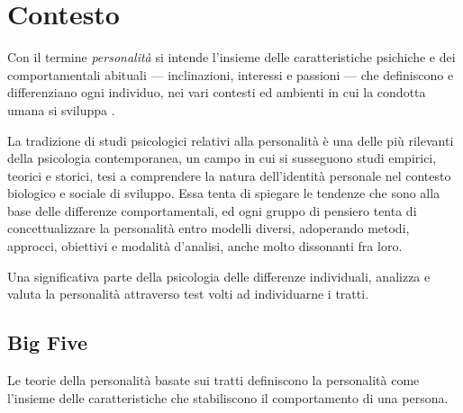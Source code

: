 \chapter{Contesto}
\label{chap:contesto}

Con il termine \emph{personalità} si intende l'insieme delle caratteristiche psichiche e dei comportamentali abituali --- inclinazioni, interessi e passioni --- che definiscono e differenziano ogni individuo, nei vari contesti ed ambienti in cui la condotta umana si sviluppa \cite{corr2009cambridge,sadock2000comprehensive}.

La tradizione di studi psicologici relativi alla personalità è una delle più rilevanti della psicologia contemporanea, un campo in cui si susseguono studi empirici, teorici e storici, tesi a comprendere la natura dell'identità personale nel contesto biologico e sociale di sviluppo.
Essa tenta di spiegare le tendenze che sono alla base delle differenze comportamentali, ed ogni gruppo di pensiero tenta di concettualizzare la personalità entro modelli diversi, adoperando metodi, approcci, obiettivi e modalità d'analisi, anche molto dissonanti fra loro.

Una significativa parte della psicologia delle differenze individuali, analizza e valuta la personalità attraverso test volti ad individuarne i tratti.

\section{Big Five}
\label{sec:big5}

Le teorie della personalità basate sui tratti definiscono la personalità come l'insieme delle caratteristiche che stabiliscono il comportamento di una persona. 


